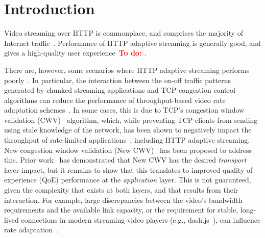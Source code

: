 \documentclass[10pt,sigconf,anonymous]{acmart}
\newcommand{\todo}[1]{\textbf{\textcolor{red}{To do: #1}}}
\begin{document}
\section{Introduction}
\label{sec:introduction}

%

Video streaming over HTTP is commonplace, and comprises the majority of Internet traffic~\cite{Sandvine-2019-global-internet-report}. Performance of HTTP adaptive streaming is generally good, and gives a high-quality user experience~\todo{\cite{..}}.
  
There are, however, some scenarios where HTTP adaptive streaming performs poorly~\cite{Spiteri-2016-BOLA,Kua-2017-a-survey-rate-adaptation-dash}. In particular, the interaction between the on-off traffic patterns generated by chunked streaming applications and TCP congestion control algorithms can reduce the performance of throughput-based video rate adaptation schemes~\cite{Akhshabi-2012-http-adaptive-players-compete,Stohr-2017-where-are-the-sweet-spots-maci}. In some cases, this is due to TCP's congestion window validation (CWV)~\cite{rfc2861-2000-padhye-congestion-window-validation} algorithm, which, while preventing TCP clients from sending using stale knowledge of the network, has been shown to negatively impact the throughput of rate-limited applications~\cite{Nazir-2014-performance-evaluation-congestion-window-validation-dash-newcwv}, including HTTP adaptive streaming. New congestion window validation (New CWV)~\cite{rfc7661-2015-fairhurst-new-cwnd-validation} has been proposed to address this. Prior work~\cite{Nazir-2014-performance-evaluation-congestion-window-validation-dash-newcwv} has demonstrated that New CWV has the desired \emph{transport} layer impact, but it remains to show that this translates to improved quality of experience (QoE) performance at the \emph{application} layer. This is not guaranteed, given the complexity that exists at both layers, and that results from their interaction. For example, large discrepancies between the video's bandwidth requirements and the available link capacity, or the requirement for stable, long-lived connections in modern streaming video players (e.g., dash.js~\cite{online-dashjs}), can influence rate adaptation~\cite{Spiteri-2019-from-theory-to-practice-sabre}.
\end{document}
